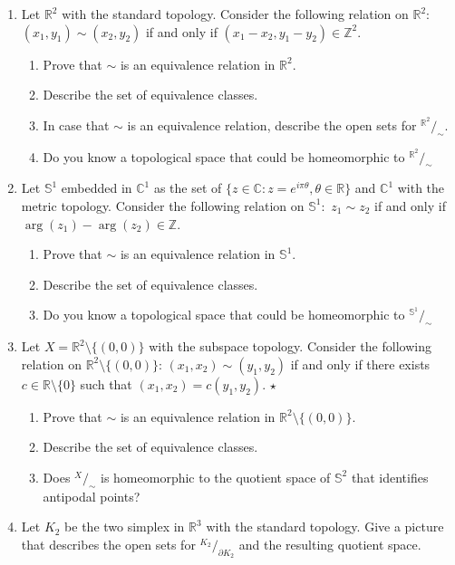 \documentclass[
	fontsize=10pt, %
	twoside=false, %
	secnumdepth=1, %
]{kaobook}
\begin{document}
\begin{enumerate}
\item Let $\mathbb{R}^2$ with the standard topology. Consider the following relation on $\mathbb{R}^2:$ $(x_1,y_1)\sim (x_2,y_2)$ if and only if $(x_1-x_2,y_1-y_2)\in\mathbb{Z}^2.$
\begin{enumerate}
\item Prove that $\sim$ is an equivalence relation in $\mathbb{R}^2.$
\item Describe the set of equivalence classes.
\item In case that $\sim$ is an equivalence relation, describe the open sets for ${}^{\mathbb{R}^2}\!/_\sim$.
\item Do you know a topological space that could be homeomorphic to ${}^{\mathbb{R}^2}\!/_\sim$
\end{enumerate}

\item  Let $\mathbb{S}^1$ embedded in $\mathbb{C}^1$ as the set of $\{z\in\mathbb{C}: z=e^{i\pi\theta},\theta\in\mathbb{R}\}$ and $\mathbb{C}^1$ with the metric topology. Consider the following relation on $\mathbb{S}^1:$ $z_1\sim z_2$ if and only if $\arg(z_1)-\arg(z_2)\in\mathbb{Z}.$
\begin{enumerate}
\item Prove that $\sim$ is an equivalence relation in $\mathbb{S}^1.$
\item Describe the set of equivalence classes.
\item Do you know a topological space that could be homeomorphic to ${}^{\mathbb{S}^1}\!/_\sim$
\end{enumerate}

\item Let $X=\mathbb{R}^2\setminus\{(0,0)\}$ with the subspace topology. Consider the following relation on $\mathbb{R}^2\setminus\{(0,0)\}$: $(x_1,x_2)\sim (y_1,y_2)$ if and only if there exists $c\in\mathbb{R}\setminus\{0\}$ such that $(x_1,x_2)=c(y_1,y_2).$ $\star$
\begin{enumerate}
\item Prove that $\sim$ is an equivalence relation in $\mathbb{R}^2\setminus\{(0,0)\}.$
\item Describe the set of equivalence classes.
\item Does ${}^{X}\!/_{\sim}$ is homeomorphic to the quotient space of $\mathbb{S}^2$  that identifies antipodal points?
\end{enumerate}


\item Let $K_2$ be the two simplex in $\mathbb{R}^3$ with the standard topology. Give a picture that describes the open sets for ${}^{K_2}\!/_{\partial K_2}$ and the resulting quotient space.


\end{enumerate}
\end{document}
